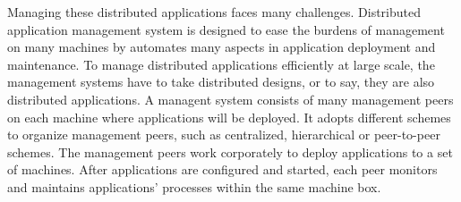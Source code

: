 


Managing these distributed applications faces many
challenges. Distributed application management system is
designed to ease the burdens of management on many machines
by automates many aspects in application deployment and
maintenance.  To manage distributed applications efficiently
at large scale, the management systems have to take
distributed designs, or to say, they are also distributed
applications.  A managent system consists of many management
peers on each machine where applications will be deployed.
It adopts different schemes to organize management peers,
such as centralized, hierarchical or peer-to-peer schemes.
The management peers work corporately to deploy applications
to a set of machines. After applications are configured and
started, each peer monitors and maintains applications'
processes within the same machine box.




